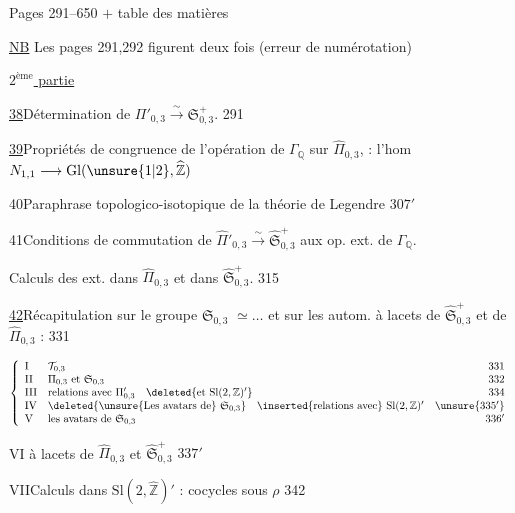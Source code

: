 
Pages 291--650 $+$ table des matières

\uline{NB} Les pages 291,292 figurent deux fois
(erreur de numérotation)


\uline{$2^{\text{ème}}$ partie}\quad
{}

\uline{38}\quad Détermination de
$\Pi'_{0,3}\xrightarrow{\sim}\mathfrak S_{0,3}^{+}$.
\hfill 291

\uline{39}\quad Propriétés de congruence de l'opération
de $\Gamma_{\mathbb Q}$ sur $\widehat{\Pi}_{0,3}$,
 : l'hom
$N_{1,1}\longrightarrow \mathrm{Gl}(\unsure{1|2},\widehat{\mathbb Z})$
\hfill {}

40\quad Paraphrase topologico-isotopique de la
théorie de Legendre
\hfill $307'$

41\quad Conditions de commutation de
$\widehat{\Pi}'_{0,3}\xrightarrow{\sim}\widehat{\mathfrak S}_{0,3}^{+}$
aux op. ext. de $\Gamma_{\mathbb Q}$.
\hfill {}

Calculs des  ext. dans $\widehat{\Pi}_{0,3}$ et
dans $\widehat{\mathfrak S}_{0,3}^{+}$.
\hfill 315

\uline{42}\quad Récapitulation sur le groupe
$\mathfrak S_{0,3}$
$\simeq\ldots$ et sur les autom. à lacets de
$\widehat{\mathfrak S}_{0,3}^{+}$ et de
$\widehat{\Pi}_{0,3}$ :
\hfill 331

\[
\left\{
\begin{array}{llr}
\mathrm{I}&\mathcal T_{0,3}&331\\
\mathrm{II}&\Pi_{0,3}\text{ et }\mathfrak S_{0,3}&332\\
\mathrm{III}&\text{relations avec }\Pi'_{0,3}\quad
\deleted{\text{et }\mathrm{Sl}(2,\mathbb Z)'}&334\\
\mathrm{IV}&\deleted{\text{\unsure{Les avatars de}}\ \mathfrak S_{0,3}}\quad
\inserted{\text{relations avec}}\ \mathrm{Sl}(2,\mathbb Z)'&\unsure{335'}\\
\mathrm{V}&\text{les avatars de }\mathfrak S_{0,3}&336'
\end{array}
\right.
\]

VI\quad {} à lacets de $\widehat{\Pi}_{0,3}$ et
$\widehat{\mathfrak S}_{0,3}^{+}$
\hfill $337'$

VII\quad Calculs dans $\mathrm{Sl}(2,\widehat{\mathbb Z})'$ :
cocycles sous $\rho$
\hfill 342

